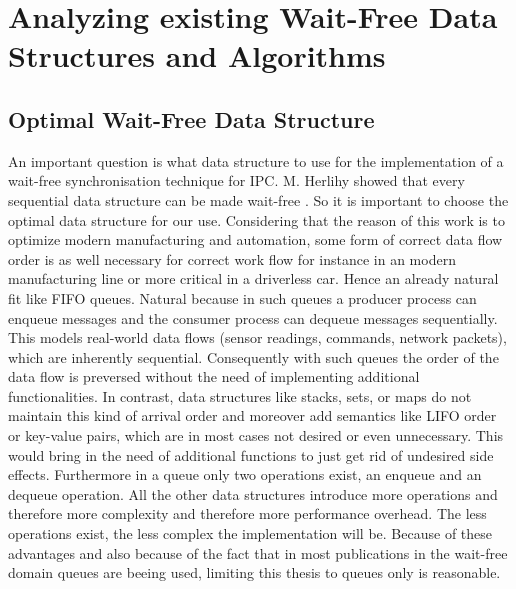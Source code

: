 \chapter{Analyzing existing Wait-Free Data Structures and Algorithms}\label{ch:choosing-the-optimal-wait-free-data-structure}

\section{Optimal Wait-Free Data Structure}\label{sec:optimal-wait-free-data-structure}

An important question is what data structure to use for the implementation of a wait-free synchronisation technique for \ac{IPC}. M. Herlihy showed that every sequential data structure can be made wait-free \cite{herlihy1991wait}. So it is important to choose the optimal data structure for our use. Considering that the reason of this work is to optimize modern manufacturing and automation, some form of correct data flow order is as well necessary for correct work flow for instance in an modern manufacturing line or more critical in a driverless car. Hence an already natural fit like \ac{FIFO} queues. Natural because in such queues a producer process can enqueue messages and the consumer process can dequeue messages sequentially. This models real-world data flows (sensor readings, commands, network packets), which are inherently sequential. Consequently with such queues the order of the data flow is preversed without the need of implementing additional functionalities. In contrast, data structures like stacks, sets, or maps do not maintain this kind of arrival order and moreover add semantics like \ac{LIFO} order or key-value pairs, which are in most cases not desired or even unnecessary. This would bring in the need of additional functions to just get rid of undesired side effects. Furthermore in a queue only two operations exist, an enqueue and an dequeue operation. All the other data structures introduce more operations and therefore more complexity and therefore more performance overhead. The less operations exist, the less complex the implementation will be. Because of these advantages and also because of the fact that in most publications in the wait-free domain queues are beeing used, limiting this thesis to queues only is reasonable. \cite{jiffy}

